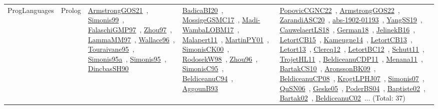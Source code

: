 {\begin{longtable}{lp{3cm}>{\raggedright\arraybackslash}p{6cm}>{\raggedright\arraybackslash}p{6cm}>{\raggedright\arraybackslash}p{8cm}}
ProgLanguages & Prolog & \href{works/ArmstrongGOS21.pdf}{ArmstrongGOS21}~\cite{ArmstrongGOS21}, \href{works/Simonis99.pdf}{Simonis99}~\cite{Simonis99}, \href{works/FalaschiGMP97.pdf}{FalaschiGMP97}~\cite{FalaschiGMP97}, \href{works/Zhou97.pdf}{Zhou97}~\cite{Zhou97}, \href{works/LammaMM97.pdf}{LammaMM97}~\cite{LammaMM97}, \href{works/Wallace96.pdf}{Wallace96}~\cite{Wallace96}, \href{works/Touraivane95.pdf}{Touraivane95}~\cite{Touraivane95}, \href{works/Simonis95a.pdf}{Simonis95a}~\cite{Simonis95a}, \href{works/Simonis95.pdf}{Simonis95}~\cite{Simonis95}, \href{works/DincbasSH90.pdf}{DincbasSH90}~\cite{DincbasSH90} & \href{works/BadicaBI20.pdf}{BadicaBI20}~\cite{BadicaBI20}, \href{works/MossigeGSMC17.pdf}{MossigeGSMC17}~\cite{MossigeGSMC17}, \href{works/Madi-WambaLOBM17.pdf}{Madi-WambaLOBM17}~\cite{Madi-WambaLOBM17}, \href{works/Malapert11.pdf}{Malapert11}~\cite{Malapert11}, \href{works/MartinPY01.pdf}{MartinPY01}~\cite{MartinPY01}, \href{works/SimonisCK00.pdf}{SimonisCK00}~\cite{SimonisCK00}, \href{works/RodosekW98.pdf}{RodosekW98}~\cite{RodosekW98}, \href{works/Zhou96.pdf}{Zhou96}~\cite{Zhou96}, \href{works/SimonisC95.pdf}{SimonisC95}~\cite{SimonisC95}, \href{works/BeldiceanuC94.pdf}{BeldiceanuC94}~\cite{BeldiceanuC94}, \href{works/AggounB93.pdf}{AggounB93}~\cite{AggounB93} & \href{works/PopovicCGNC22.pdf}{PopovicCGNC22}~\cite{PopovicCGNC22}, \href{works/ArmstrongGOS22.pdf}{ArmstrongGOS22}~\cite{ArmstrongGOS22}, \href{works/ZarandiASC20.pdf}{ZarandiASC20}~\cite{ZarandiASC20}, \href{works/abs-1902-01193.pdf}{abs-1902-01193}~\cite{abs-1902-01193}, \href{works/YangSS19.pdf}{YangSS19}~\cite{YangSS19}, \href{works/CauwelaertLS18.pdf}{CauwelaertLS18}~\cite{CauwelaertLS18}, \href{works/German18.pdf}{German18}~\cite{German18}, \href{works/JelinekB16.pdf}{JelinekB16}~\cite{JelinekB16}, \href{works/LetortCB15.pdf}{LetortCB15}~\cite{LetortCB15}, \href{works/Kameugne14.pdf}{Kameugne14}~\cite{Kameugne14}, \href{works/LetortCB13.pdf}{LetortCB13}~\cite{LetortCB13}, \href{works/Letort13.pdf}{Letort13}~\cite{Letort13}, \href{works/Clercq12.pdf}{Clercq12}~\cite{Clercq12}, \href{works/LetortBC12.pdf}{LetortBC12}~\cite{LetortBC12}, \href{works/Schutt11.pdf}{Schutt11}~\cite{Schutt11}, \href{works/TrojetHL11.pdf}{TrojetHL11}~\cite{TrojetHL11}, \href{works/BeldiceanuCDP11.pdf}{BeldiceanuCDP11}~\cite{BeldiceanuCDP11}, \href{works/Menana11.pdf}{Menana11}~\cite{Menana11}, \href{works/BartakCS10.pdf}{BartakCS10}~\cite{BartakCS10}, \href{works/AronssonBK09.pdf}{AronssonBK09}~\cite{AronssonBK09}, \href{works/BeldiceanuCP08.pdf}{BeldiceanuCP08}~\cite{BeldiceanuCP08}, \href{works/KrogtLPHJ07.pdf}{KrogtLPHJ07}~\cite{KrogtLPHJ07}, \href{works/Simonis07.pdf}{Simonis07}~\cite{Simonis07}, \href{works/QuSN06.pdf}{QuSN06}~\cite{QuSN06}, \href{works/Geske05.pdf}{Geske05}~\cite{Geske05}, \href{works/PoderBS04.pdf}{PoderBS04}~\cite{PoderBS04}, \href{works/Baptiste02.pdf}{Baptiste02}~\cite{Baptiste02}, \href{works/Bartak02.pdf}{Bartak02}~\cite{Bartak02}, \href{works/BeldiceanuC02.pdf}{BeldiceanuC02}~\cite{BeldiceanuC02}... (Total: 37)\\

\end{longtable}}
